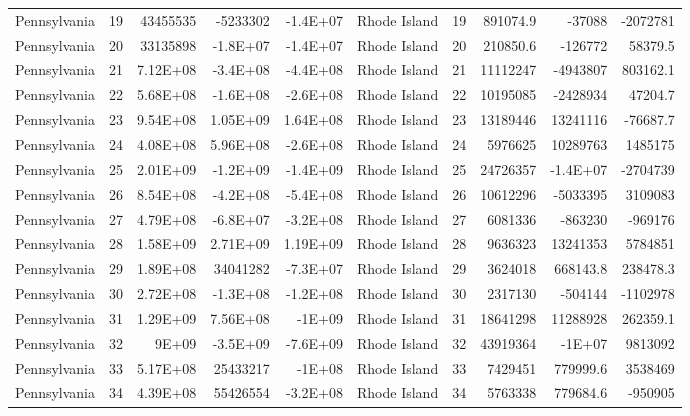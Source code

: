 \begin{landscape}
\begin{singlespace}
\begin{longtable}{lrrrr|lrrrr}
		Pennsylvania &  19 & 43455535 & -5233302 & -1.4E+07 & Rhode Island &  19 & 891074.9 & -37088 & -2072781 \\
		Pennsylvania &  20 & 33135898 & -1.8E+07 & -1.4E+07 & Rhode Island &  20 & 210850.6 & -126772 & 58379.5 \\
		Pennsylvania &  21 & 7.12E+08 & -3.4E+08 & -4.4E+08 & Rhode Island &  21 & 11112247 & -4943807 & 803162.1 \\
		Pennsylvania &  22 & 5.68E+08 & -1.6E+08 & -2.6E+08 & Rhode Island &  22 & 10195085 & -2428934 & 47204.7 \\
		Pennsylvania &  23 & 9.54E+08 & 1.05E+09 & 1.64E+08 & Rhode Island &  23 & 13189446 & 13241116 & -76687.7 \\
		Pennsylvania &  24 & 4.08E+08 & 5.96E+08 & -2.6E+08 & Rhode Island &  24 & 5976625 & 10289763 & 1485175 \\
		Pennsylvania &  25 & 2.01E+09 & -1.2E+09 & -1.4E+09 & Rhode Island &  25 & 24726357 & -1.4E+07 & -2704739 \\
		Pennsylvania &  26 & 8.54E+08 & -4.2E+08 & -5.4E+08 & Rhode Island &  26 & 10612296 & -5033395 & 3109083 \\
		Pennsylvania &  27 & 4.79E+08 & -6.8E+07 & -3.2E+08 & Rhode Island &  27 & 6081336 & -863230 & -969176 \\
		Pennsylvania &  28 & 1.58E+09 & 2.71E+09 & 1.19E+09 & Rhode Island &  28 & 9636323 & 13241353 & 5784851 \\
		Pennsylvania &  29 & 1.89E+08 & 34041282 & -7.3E+07 & Rhode Island &  29 & 3624018 & 668143.8 & 238478.3 \\
		Pennsylvania &  30 & 2.72E+08 & -1.3E+08 & -1.2E+08 & Rhode Island &  30 & 2317130 & -504144 & -1102978 \\
		Pennsylvania &  31 & 1.29E+09 & 7.56E+08 & -1E+09 & Rhode Island &  31 & 18641298 & 11288928 & 262359.1 \\
		Pennsylvania &  32 & 9E+09 & -3.5E+09 & -7.6E+09 & Rhode Island &  32 & 43919364 & -1E+07 & 9813092 \\
		Pennsylvania &  33 & 5.17E+08 & 25433217 & -1E+08 & Rhode Island &  33 & 7429451 & 779999.6 & 3538469 \\
		Pennsylvania &  34 & 4.39E+08 & 55426554 & -3.2E+08 & Rhode Island &  34 & 5763338 & 779684.6 & -950905\\


\end{longtable}
\end{singlespace}
\end{landscape}
